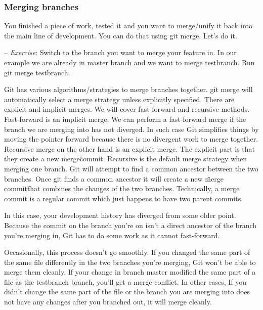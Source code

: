 \documentclass[12pt,a4]{article}
\newcommand{\ilcode}[1]{\textcolor[RGB]{160, 110, 220}{#1}}
\begin{document}
\begin{center}
\end{center}

\subsubsection{Merging branches}
You finished a piece of work, tested it and you want to merge/unify it back into
the main line of development. You can do that using \ilcode{git merge}. Let's do
it.

{\sf -- \emph{Exercise}:} Switch to the branch you want to merge your feature
in. In our example we are already in master branch and we want to merge
testbranch. Run \ilcode{git merge testbranch}.

Git has various algorithms/strategies to merge branches together. \ilcode{git
merge} will automatically select a merge strategy unless explicitly specified.
There are explicit and implicit merges. We will cover fast-forward and recursive
methods. Fast-forward is an implicit merge. We can perform a fast-forward merge
if the branch we are merging into has not diverged. In such case Git simplifies
things by moving the pointer forward because there is no divergent work to merge
together. Recursive merge on the other hand is an explicit merge. The explicit
part is that they create a new \"merge\" commit. Recursive is the default merge
strategy when merging one branch. Git will attempt to find a common ancestor
between the two branches. Once git finds a common ancestor it will create a new
\"merge commit\" that combines the changes of the two branches. Technically, a
merge commit is a regular commit which just happens to have two parent commits.

In this case, your development history has diverged from some older point.
Because the commit on the branch you’re on isn’t a direct ancestor of the branch
you’re merging in, Git has to do some work as it cannot fast-forward.

Occasionally, this process doesn’t go smoothly. If you changed the same part of
the same file differently in the two branches you’re merging, Git won’t be able
to merge them cleanly. If your change in branch master modified the same part of
a file as the testbranch branch, you’ll get a merge conflict. In other cases, If
you didn't change the same part of the file or the branch you are merging into
does not have any changes after you branched out, it will merge cleanly.
\end{document}
